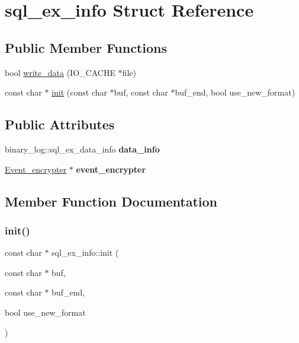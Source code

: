 \hypertarget{structsql__ex__info}{}\section{sql\+\_\+ex\+\_\+info Struct Reference}
\label{structsql__ex__info}
\subsection*{Public Member Functions}
\begin{DoxyCompactItemize}
\item 
bool \mbox{\hyperlink{structsql__ex__info_a90e3b19d97cb512779dd0bf6112d4fd0}{write\+\_\+data}} (I\+O\+\_\+\+C\+A\+C\+HE $\ast$file)
\item 
const char $\ast$ \mbox{\hyperlink{structsql__ex__info_afc2ad48f8753d51dd01acd841eecce43}{init}} (const char $\ast$buf, const char $\ast$buf\+\_\+end, bool use\+\_\+new\+\_\+format)
\end{DoxyCompactItemize}
\subsection*{Public Attributes}
\begin{DoxyCompactItemize}
\item 
\mbox{\label{structsql__ex__info_a9fe87c09ce28e404230cc1bdb39fdda2}} 
binary\+\_\+log\+::sql\+\_\+ex\+\_\+data\+\_\+info {\bfseries data\+\_\+info}
\item 
\mbox{\label{structsql__ex__info_a8145d4a9d261b8d249b945715737532c}} 
\mbox{\hyperlink{classEvent__encrypter}{Event\+\_\+encrypter}} $\ast$ {\bfseries event\+\_\+encrypter}
\end{DoxyCompactItemize}


\subsection{Member Function Documentation}
\mbox{\label{structsql__ex__info_afc2ad48f8753d51dd01acd841eecce43}} 
\subsubsection{\texorpdfstring{init()}{init()}}
{\footnotesize\ttfamily const char $\ast$ sql\+\_\+ex\+\_\+info\+::init (\begin{DoxyParamCaption}\item[{const char $\ast$}]{buf,  }\item[{const char $\ast$}]{buf\+\_\+end,  }\item[{bool}]{use\+\_\+new\+\_\+format }\end{DoxyParamCaption})}

